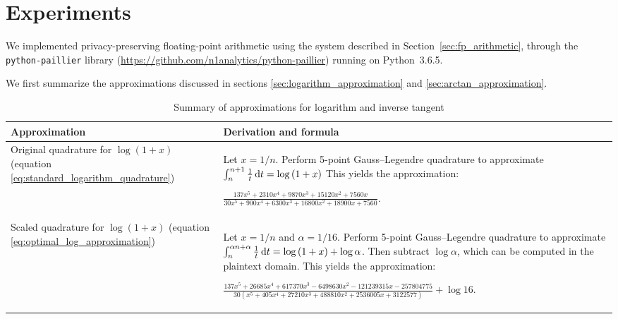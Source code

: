 \section{Experiments}
We implemented privacy-preserving floating-point arithmetic using the system described in Section~\ref{sec:fp_arithmetic}, through the \texttt{python-paillier} library (\url{https://github.com/n1analytics/python-paillier}) running on Python~3.6.5.

We first summarize the approximations discussed in sections \ref{sec:logarithm_approximation} and \ref{sec:arctan_approximation}. %

\begin{table*}[ht]
	\caption{Summary of approximations for logarithm and inverse tangent}
	\label{tab:approximation_summary}
    \begin{tabular}{
        p{}
        p{}}
		\toprule
		Approximation & Derivation and formula\\
		\midrule
            Original quadrature for $\log\left(1+x\right)$ (equation \ref{eq:standard_logarithm_quadrature})
            & Let $x=1/n$. Perform 5-point Gauss--Legendre quadrature to approximate $\int_{n}^{n+1}{\frac{1}{t}\mathop{}\!\mathrm{d} t} = \log\left(1+x\right)$ This yields the approximation:
            \begin{center}
                $\displaystyle 
            \frac{137x^5 + 2310x^4 + 9870x^3 + 15120x^2 + 7560x}
            {30x^5 + 900x^4 + 6300x^3 + 16800x^2 + 18900x + 7560}$.
            \end{center}
            \\[10pt]

            Scaled quadrature for $\log\left(1+x\right)$ (equation \ref{eq:optimal_log_approximation})
            & Let $x=1/n$ and $\alpha= 1/16$. Perform 5-point Gauss--Legendre quadrature to approximate $\int_{n}^{\alpha n + \alpha}{\frac{1}{t}\mathop{}\!\mathrm{d} t} = \log\left(1+x\right) + \log\alpha$. 
            Then subtract $\log\alpha$, which can be computed in the plaintext domain. This yields the approximation:
            \begin{center}
            $\displaystyle 
            \frac{137x^5 + 26685x^4 + 617370x^3 - 6498630x^2 - 121239315x - 257804775}
            {30(x^5 + 405x^4 + 27210x^3 + 488810x^2 + 2536005x + 3122577)}
            + \log{16}$.
            \end{center}
            \\[10pt]
            

\end{tabular}
\end{table*}
